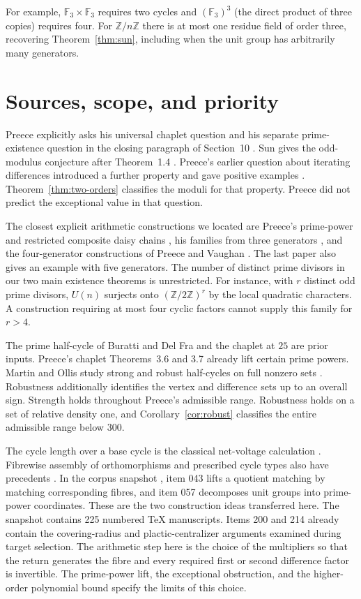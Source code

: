 \documentclass[11pt,a4paper]{article}
\newcommand{\U}{U}
\newcommand{\F}{\mathbb F}
\newcommand{\Z}{\mathbb Z}
\begin{document}
For example, $\F_3\times\F_3$ requires two cycles and $(\F_3)^3$ (the direct product of three copies) requires four. For $\Z/n\Z$ there is at most one residue field of order three, recovering Theorem~\ref{thm:sun}, including when the unit group has arbitrarily many generators.
\section{Sources, scope, and priority}
Preece explicitly asks his universal chaplet question and his separate prime-existence question in the closing paragraph of Section~10 \cite{chaplet}. Sun gives the odd-modulus conjecture after Theorem~1.4 \cite{sun}. Preece's earlier question about iterating differences introduced a further property and gave positive examples \cite[Section~6]{preece08}. Theorem~\ref{thm:two-orders} classifies the moduli for that property. Preece did not predict the exceptional value in that question.
\par
The closest explicit arithmetic constructions we located are Preece's prime-power and restricted composite daisy chains \cite{preece08}, his families from three generators \cite{preece09}, and the four-generator constructions of Preece and Vaughan \cite{pv}. The last paper also gives an example with five generators. The number of distinct prime divisors in our two main existence theorems is unrestricted. For instance, with $r$ distinct odd prime divisors, $\U(n)$ surjects onto $(\Z/2\Z)^r$ by the local quadratic characters. A construction requiring at most four cyclic factors cannot supply this family for $r>4$.
\par
The prime half-cycle of Buratti and Del Fra and the chaplet at $25$ are prior inputs. Preece's chaplet Theorems~3.6 and 3.7 already lift certain prime powers. Martin and Ollis study strong and robust half-cycles on full nonzero sets \cite{mo}. Robustness additionally identifies the vertex and difference sets up to an overall sign. Strength holds throughout Preece's admissible range. Robustness holds on a set of relative density one, and Corollary~\ref{cor:robust} classifies the entire admissible range below $300$.
\par
The cycle length over a base cycle is the classical net-voltage calculation \cite{gt}. Fibrewise assembly of orthomorphisms and prescribed cycle types also have precedents \cite{sw,bw}. In the corpus snapshot \cite{vmrc}, item 043 lifts a quotient matching by matching corresponding fibres, and item 057 decomposes unit groups into prime-power coordinates. These are the two construction ideas transferred here. The snapshot contains 225 numbered TeX manuscripts. Items 200 and 214 already contain the covering-radius and plactic-centralizer arguments examined during target selection. The arithmetic step here is the choice of the multipliers so that the return generates the fibre and every required first or second difference factor is invertible. The prime-power lift, the exceptional obstruction, and the higher-order polynomial bound specify the limits of this choice.
\end{document}
